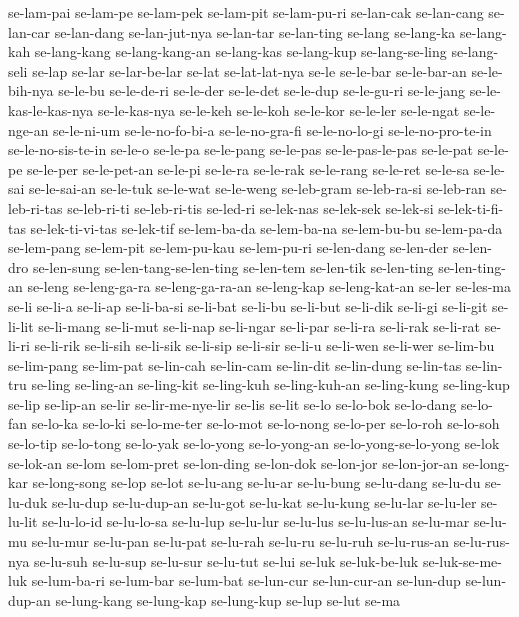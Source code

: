 {se-lam-pai se-lam-pe se-lam-pek se-lam-pit se-lam-pu-ri se-lan-cak
se-lan-cang se-lan-car se-lan-dang se-lan-jut-nya se-lan-tar se-lan-ting
se-lang se-lang-ka se-lang-kah se-lang-kang se-lang-kang-an se-lang-kas
se-lang-kup se-lang-se-ling se-lang-seli se-lap se-lar se-lar-be-lar
se-lat se-lat-lat-nya se-le se-le-bar se-le-bar-an se-le-bih-nya se-le-bu
se-le-de-ri se-le-der se-le-det se-le-dup se-le-gu-ri se-le-jang
se-le-kas-le-kas-nya se-le-kas-nya se-le-keh se-le-koh se-le-kor se-le-ler
se-le-ngat se-le-nge-an se-le-ni-um se-le-no-fo-bi-a se-le-no-gra-fi
se-le-no-lo-gi se-le-no-pro-te-in se-le-no-sis-te-in se-le-o se-le-pa
se-le-pang se-le-pas se-le-pas-le-pas se-le-pat se-le-pe se-le-per
se-le-pet-an se-le-pi se-le-ra se-le-rak se-le-rang se-le-ret se-le-sa
se-le-sai se-le-sai-an se-le-tuk se-le-wat se-le-weng se-leb-gram
se-leb-ra-si se-leb-ran se-leb-ri-tas se-leb-ri-ti se-leb-ri-tis se-led-ri
se-lek-nas se-lek-sek se-lek-si se-lek-ti-fi-tas se-lek-ti-vi-tas
se-lek-tif se-lem-ba-da se-lem-ba-na se-lem-bu-bu se-lem-pa-da se-lem-pang
se-lem-pit se-lem-pu-kau se-lem-pu-ri se-len-dang se-len-der se-len-dro
se-len-sung se-len-tang-se-len-ting se-len-tem se-len-tik se-len-ting
se-len-ting-an se-leng se-leng-ga-ra se-leng-ga-ra-an se-leng-kap
se-leng-kat-an se-ler se-les-ma se-li se-li-a se-li-ap se-li-ba-si
se-li-bat se-li-bu se-li-but se-li-dik se-li-gi se-li-git se-li-lit
se-li-mang se-li-mut se-li-nap se-li-ngar se-li-par se-li-ra se-li-rak
se-li-rat se-li-ri se-li-rik se-li-sih se-li-sik se-li-sip se-li-sir
se-li-u se-li-wen se-li-wer se-lim-bu se-lim-pang se-lim-pat se-lin-cah
se-lin-cam se-lin-dit se-lin-dung se-lin-tas se-lin-tru se-ling se-ling-an
se-ling-kit se-ling-kuh se-ling-kuh-an se-ling-kung se-ling-kup se-lip
se-lip-an se-lir se-lir-me-nye-lir se-lis se-lit se-lo se-lo-bok
se-lo-dang se-lo-fan se-lo-ka se-lo-ki se-lo-me-ter se-lo-mot se-lo-nong
se-lo-per se-lo-roh se-lo-soh se-lo-tip se-lo-tong se-lo-yak se-lo-yong
se-lo-yong-an se-lo-yong-se-lo-yong se-lok se-lok-an se-lom se-lom-pret
se-lon-ding se-lon-dok se-lon-jor se-lon-jor-an se-long-kar se-long-song
se-lop se-lot se-lu-ang se-lu-ar se-lu-bung se-lu-dang se-lu-du se-lu-duk
se-lu-dup se-lu-dup-an se-lu-got se-lu-kat se-lu-kung se-lu-lar se-lu-ler
se-lu-lit se-lu-lo-id se-lu-lo-sa se-lu-lup se-lu-lur se-lu-lus
se-lu-lus-an se-lu-mar se-lu-mu se-lu-mur se-lu-pan se-lu-pat se-lu-rah
se-lu-ru se-lu-ruh se-lu-rus-an se-lu-rus-nya se-lu-suh se-lu-sup
se-lu-sur se-lu-tut se-lui se-luk se-luk-be-luk se-luk-se-me-luk
se-lum-ba-ri se-lum-bar se-lum-bat se-lun-cur se-lun-cur-an se-lun-dup
se-lun-dup-an se-lung-kang se-lung-kap se-lung-kup se-lup se-lut se-ma
}
